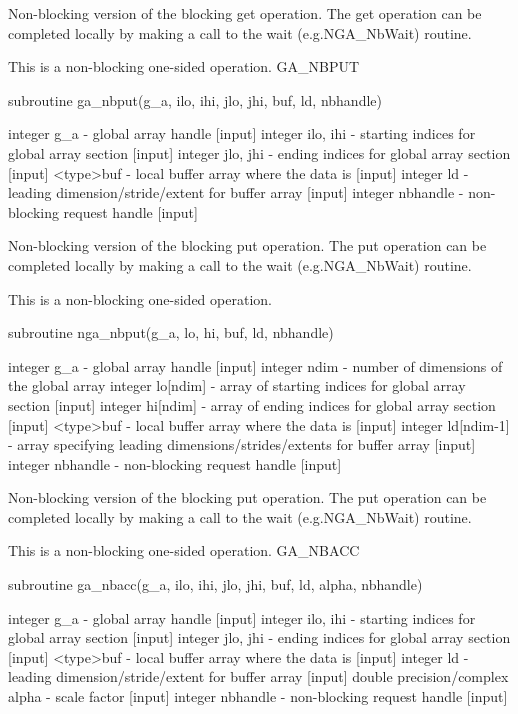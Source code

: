 Non-blocking version of the blocking get operation. The get operation
can be completed locally by making a call to the wait (e.g.NGA\_NbWait)
routine.

This is a non-blocking one-sided operation. GA\_NBPUT

subroutine ga\_nbput(g\_a, ilo, ihi, jlo, jhi, buf, ld, nbhandle)

integer g\_a - global array handle {[}input{]} integer ilo, ihi -
starting indices for global array section {[}input{]} integer jlo,
jhi - ending indices for global array section {[}input{]} <type>buf
- local buffer array where the data is {[}input{]} integer ld - leading
dimension/stride/extent for buffer array {[}input{]} integer nbhandle
- non-blocking request handle {[}input{]}

Non-blocking version of the blocking put operation. The put operation
can be completed locally by making a call to the wait (e.g.NGA\_NbWait)
routine.

This is a non-blocking one-sided operation.

subroutine nga\_nbput(g\_a, lo, hi, buf, ld, nbhandle)

integer g\_a - global array handle {[}input{]} integer ndim - number
of dimensions of the global array integer lo{[}ndim{]} - array of
starting indices for global array section {[}input{]} integer hi{[}ndim{]}
- array of ending indices for global array section {[}input{]} <type>buf
- local buffer array where the data is {[}input{]} integer ld{[}ndim-1{]}
- array specifying leading dimensions/strides/extents for buffer array
{[}input{]} integer nbhandle - non-blocking request handle {[}input{]}

Non-blocking version of the blocking put operation. The put operation
can be completed locally by making a call to the wait (e.g.NGA\_NbWait)
routine.

This is a non-blocking one-sided operation. GA\_NBACC

subroutine ga\_nbacc(g\_a, ilo, ihi, jlo, jhi, buf, ld, alpha, nbhandle)

integer g\_a - global array handle {[}input{]} integer ilo, ihi -
starting indices for global array section {[}input{]} integer jlo,
jhi - ending indices for global array section {[}input{]} <type>buf
- local buffer array where the data is {[}input{]} integer ld - leading
dimension/stride/extent for buffer array {[}input{]} double precision/complex
alpha - scale factor {[}input{]} integer nbhandle - non-blocking request
handle {[}input{]}

